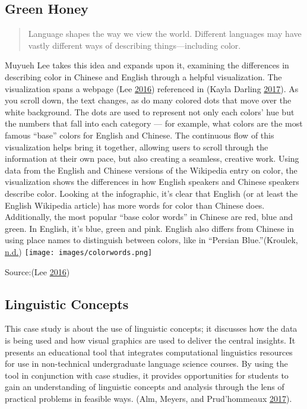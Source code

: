 \documentclass[]{book}
\begin{document}
\hypertarget{green-honey}{%
\subsection{Green Honey}\label{green-honey}}

\begin{quote}
Language shapes the way we view the world. Different languages may have vastly different ways of describing things---including color.
\end{quote}

Muyueh Lee takes this idea and expands upon it, examining the differences in describing color in Chinese and English through a helpful visualization.
The visualization spans a webpage (Lee \protect\hyperlink{ref-green_honey}{2016}) referenced in (Kayla Darling \protect\hyperlink{ref-cool_data}{2017}). As you scroll down, the text changes, as do many colored dots that move over the white background. The dots are used to represent not only each colors' hue but the numbers that fall into each category --- for example, what colors are the most famous ``base'' colors for English and Chinese. The continuous flow of this visualization helps bring it together, allowing users to scroll through the information at their own pace, but also creating a seamless, creative work.
Using data from the English and Chinese versions of the Wikipedia entry on color, the visualization shows the differences in how English speakers and Chinese speakers describe color. Looking at the infographic, it's clear that English (or at least the English Wikipedia article) has more words for color than Chinese does. Additionally, the most popular ``base color words'' in Chinese are red, blue and green. In English, it's blue, green and pink. English also differs from Chinese in using place names to distinguish between colors, like in ``Persian Blue.''(Kroulek, \protect\hyperlink{ref-Colors-in-Translation}{n.d.})
\texttt{[image: images/colorwords.png]}

Source:(Lee \protect\hyperlink{ref-green_honey}{2016})

\hypertarget{linguistic-concepts}{%
\subsection{Linguistic Concepts}\label{linguistic-concepts}}

This case study is about the use of linguistic concepts; it discusses how the data is being used and how visual graphics are used to deliver the central insights. It presents an educational tool that integrates computational linguistics resources for use in non-technical undergraduate language science courses. By using the tool in conjunction with case studies, it provides opportunities for students to gain an understanding of linguistic concepts and analysis through the lens of practical problems in feasible ways. (Alm, Meyers, and Prud'hommeaux \protect\hyperlink{ref-lingui_data}{2017}).
\end{document}
